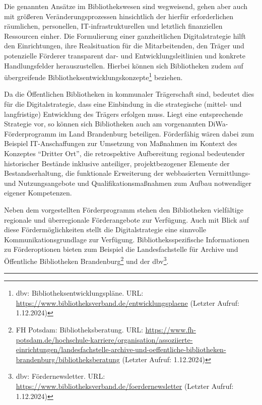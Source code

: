 \documentclass[a4paper,
fontsize=11pt,
oneside,
numbers=noperiodatend,
parskip=half-,
bibliography=totoc,
final
]{scrartcl}
\begin{document}
Die genannten Ansätze im Bibliothekswesen sind wegweisend, gehen aber
auch mit größeren Veränderungsprozessen hinsichtlich der hierfür
erforderlichen räumlichen, personellen, IT-infrastrukturellen und
letztlich finanziellen Ressourcen einher. Die Formulierung einer
ganzheitlichen Digitalstrategie hilft den Einrichtungen, ihre
Realsituation für die Mitarbeitenden, den Träger und potenzielle
Förderer transparent dar- und Entwicklungsleitlinien und konkrete
Handlungsfelder herauszustellen. Hierbei können sich Bibliotheken zudem
auf übergreifende Bibliotheksentwicklungskonzepte\footnote{dbv:
  Bibliotheksentwicklungspläne. URL:
  \url{https://www.bibliotheksverband.de/entwicklungsplaene} (Letzter
  Aufruf: 1.12.2024)} beziehen.

Da die Öffentlichen Bibliotheken in kommunaler Trägerschaft sind,
bedeutet dies für die Digitalstrategie, dass eine Einbindung in die
strategische (mittel- und langfristige) Entwicklung des Trägers erfolgen
muss. Liegt eine entsprechende Strategie vor, so können sich
Bibliotheken auch am vorgenannten DiWa-Förderprogramm im Land
Brandenburg beteiligen. Förderfähig wären dabei zum Beispiel
IT-Anschaffungen zur Umsetzung von Maßnahmen im Kontext des Konzeptes
\enquote{Dritter Ort}, die retrospektive Aufbereitung regional
bedeutender historischer Bestände inklusive anteiliger, projektbezogener
Elemente der Bestandserhaltung, die funktionale Erweiterung der
webbasierten Vermittlungs- und Nutzungsangebote und
Qualifikationsmaßnahmen zum Aufbau notwendiger eigener Kompetenzen.

Neben dem vorgestellten Förderprogramm stehen den Bibliotheken
vielfältige regionale und überregionale Förderangebote zur Verfügung.
Auch mit Blick auf diese Fördermöglichkeiten stellt die Digitalstrategie
eine sinnvolle Kommunikationsgrundlage zur Verfügung.
Bibliotheksspezifische Informationen zu Förderoptionen bieten zum
Beispiel die Landesfachstelle für Archive und Öffentliche Bibliotheken
Brandenburg\footnote{FH Potsdam: Bibliotheksberatung. URL:
  \url{https://www.fh-potsdam.de/hochschule-karriere/organisation/assoziierte-einrichtungen/landesfachstelle-archive-und-oeffentliche-bibliotheken-brandenburg/bibliotheksberatung}
  (Letzter Aufruf: 1.12.2024)} und der dbv\footnote{dbv:
  Fördernewsletter. URL:
  \url{https://www.bibliotheksverband.de/foerdernewsletter} (Letzter
  Aufruf: 1.12.2024)}.

\begin{center}\rule{0.5\linewidth}{0.5pt}\end{center}
\end{document}
